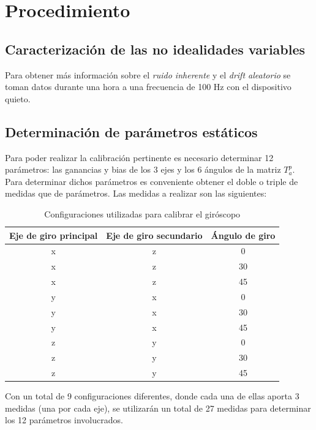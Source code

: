 \documentclass[main]{subfiles}
\begin{document}
\section{Procedimiento}
\subsection{Caracterización de las no idealidades variables}

Para obtener más información sobre el \emph{ruido inherente} y el \emph{drift aleatorio} se toman datos durante una hora a una frecuencia de 100 Hz con el dispositivo quieto.\\

\subsection{Determinación de parámetros estáticos}

Para poder realizar la calibración pertinente es necesario determinar 12 parámetros: las ganancias y bias de los 3 ejes y los 6 ángulos de la matriz $T^p_a$. Para determinar dichos parámetros es conveniente obtener el doble o triple de medidas que de parámetros. Las medidas a realizar son las siguientes:

\begin{table}[H]
\centering
\begin{small}
\begin{tabular}{|c|c|c|}
\hline
  {\cellcolor[gray]{0.85} \centering \textbf{Eje de giro principal}}
& {\cellcolor[gray]{0.85} \centering \textbf{Eje de giro secundario}}
& {\cellcolor[gray]{0.85} \centering \textbf{Ángulo de giro}} \\ \hline  \hline
x & z & 0 \\ \hline
x & z & 30 \\ \hline
x & z & 45 \\ \hline
y & x & 0 \\ \hline
y & x & 30 \\ \hline
y & x & 45 \\ \hline
z & y & 0 \\ \hline
z & y & 30 \\ \hline
z & y & 45 \\ \hline
\end{tabular}
\caption{Configuraciones utilizadas para calibrar el giróscopo}
\label{tab:gyros}
\end{small}
\end{table} 

Con un total de 9 configuraciones diferentes, donde cada una de ellas aporta 3 medidas (una por cada eje), se utilizarán un total de 27 medidas para determinar los 12 parámetros involucrados.
\end{document}

